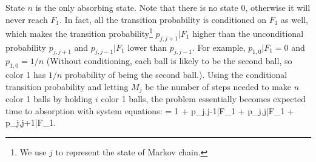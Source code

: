 \begin{solution}[\bf Solution.]
%
%
%
%
%
%
%
%
%
%
%
%
%
%
%
%

State $n$ is the only absorbing state. Note that there is no state 0, otherwise it will never reach $F_1$. In fact, all the transition probability is conditioned on $F_1$ as well, which makes the
transition probability\footnote{We use $j$ to represent the state of Markov chain.} $p_{j,j+1}|F_1$ higher than the unconditional probability $p_{j,j+1}$ and $p_{j,j-1}|F_1$ lower than $p_{j,j-1}$.
For example, $p_{1,0}|F_1 = 0$ and $p_{1,0} = 1/n$ (Without conditioning, each ball is likely to be the second ball, so color 1 has $1/n$ probability of being the second ball.). Using the conditional transition probability and letting $M_j$ be the number of steps needed to make $n$ color 1 balls by holding $i$ color 1 balls, the problem essentially becomes expected time to absorption
with system equations:
\be
\E{}  = 1 + \E{} p_{j,j-1}|F_1 + \E{} p_{j,j}|F_1 + \E{} p_{j,j+1}|F_1.
\ee


\end{solution}
